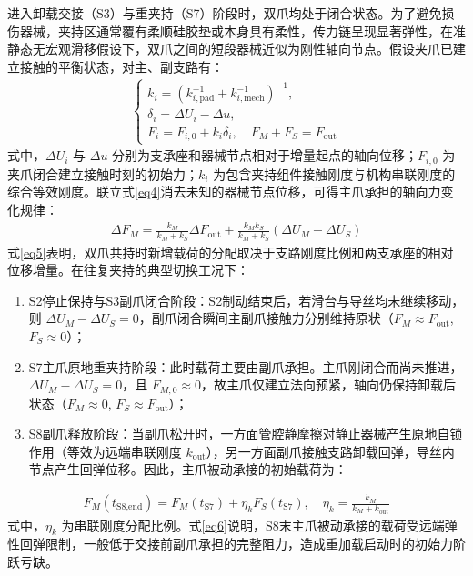 \documentclass{JQRnew}
\begin{document}
进入卸载交接（S3）与重夹持（S7）阶段时，双爪均处于闭合状态。为了避免损伤器械，夹持区通常覆有柔顺硅胶垫或本身具有柔性，传力链呈现显著弹性，在准静态无宏观滑移假设下，双爪之间的短段器械近似为刚性轴向节点。假设夹爪已建立接触的平衡状态，对主、副支路有：
\begin{align}
	\label{eq4}
	\begin{cases}
		k_{i} = \left( k_{i,\text{pad}}^{-1} + k_{i,\text{mech}}^{-1} \right)^{-1}, \\
		\delta_i = \Delta U_i - \Delta u, \\
		F_i = F_{i,0} + k_i \delta_i,\quad F_M + F_S = F_{\text{out}}
	\end{cases}
\end{align}
式中，$\Delta U_i$ 与 $\Delta u$ 分别为支承座和器械节点相对于增量起点的轴向位移；$F_{i,0}$ 为夹爪闭合建立接触时刻的初始力；$k_i$ 为包含夹持组件接触刚度与机构串联刚度的综合等效刚度。联立式\eqref{eq4}消去未知的器械节点位移，可得主爪承担的轴向力变化规律：
\begin{align}
	\label{eq5}
	\Delta F_M = \frac{k_M}{k_M + k_S}\Delta F_{\text{out}} + \frac{k_M k_S}{k_M + k_S}(\Delta U_M - \Delta U_S)
\end{align}
式\eqref{eq5}表明，双爪共持时新增载荷的分配取决于支路刚度比例和两支承座的相对位移增量。在往复夹持的典型切换工况下：
\begin{enumerate}
\item[1)] S2停止保持与S3副爪闭合阶段：S2制动结束后，若滑台与导丝均未继续移动，则 $\Delta U_M - \Delta U_S = 0$，副爪闭合瞬间主副爪接触力分别维持原状（$F_M \approx F_{\text{out}}$, $F_S \approx 0$）；
\item[2)] S7主爪原地重夹持阶段：此时载荷主要由副爪承担。主爪刚闭合而尚未推进，$\Delta U_M - \Delta U_S = 0$，且 $F_{M,0} \approx 0$，故主爪仅建立法向预紧，轴向仍保持卸载后状态（$F_M \approx 0$, $F_S \approx F_{\text{out}}$）；
\item[3)] S8副爪释放阶段：当副爪松开时，一方面管腔静摩擦对静止器械产生原地自锁作用（等效为远端串联刚度 $k_{\text{out}}$），另一方面副爪接触支路卸载回弹，导丝内节点产生回弹位移。因此，主爪被动承接的初始载荷为：
\end{enumerate}
\begin{align}
	\label{eq6}
	F_M(t_{\text{S8,end}}) = F_M(t_{\text{S7}}) + \eta_k F_S(t_{\text{S7}}),\quad \eta_k = \frac{k_M}{k_M + k_{\text{out}}}
\end{align}
式中，$\eta_k$ 为串联刚度分配比例。式\eqref{eq6}说明，S8末主爪被动承接的载荷受远端弹性回弹限制，一般低于交接前副爪承担的完整阻力，造成重加载启动时的初始力阶跃亏缺。
\end{document}
